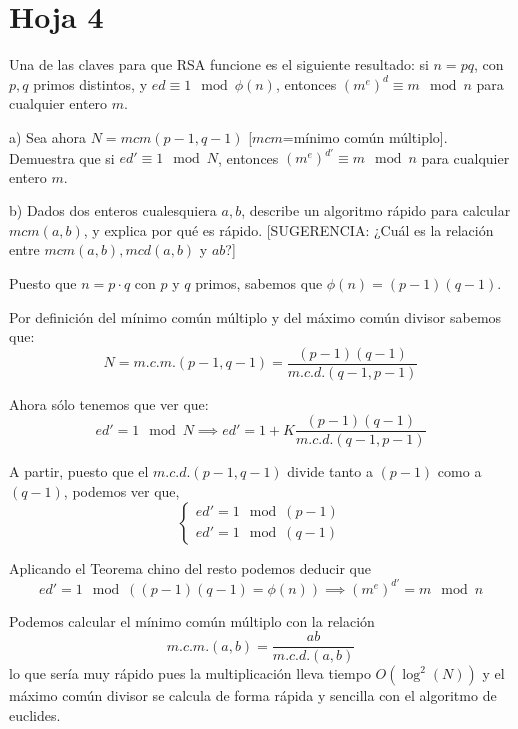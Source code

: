\section{Hoja 4}
\begin{problem}[1]
 Una de las claves para que RSA funcione es el siguiente resultado:
 si $n=pq$, con $p,q$ primos distintos, y  $ed\equiv 1 \mod \phi(n)$, entonces $(m^e)^d\equiv m \mod n$ para cualquier entero $m$.

a) Sea ahora $N=mcm(p-1,q-1)$ [$mcm$=mínimo común múltiplo].
Demuestra que si  $ed'\equiv 1 \mod N$, entonces $(m^e)^{d'}\equiv
m \mod n$ para cualquier entero $m$.

b) Dados dos enteros cualesquiera $a,b$, describe un algoritmo
rápido para calcular $mcm(a,b)$, y explica por qué es rápido.
[SUGERENCIA: ¿Cuál es la relación entre $mcm(a,b), mcd(a,b)$ y
$ab$?]
\solution


\spart
Puesto que $n=p\cdot q$ con $p$ y $q$ primos, sabemos que $\phi(n) = (p-1)(q-1)$.

Por definición del mínimo común múltiplo y del máximo común divisor sabemos que:
\[N=m.c.m.(p-1,q-1) = \frac{(p-1)(q-1)}{m.c.d.(q-1,p-1)}\]

Ahora sólo tenemos que ver que:
\[ed'=1\mod N \implies ed' = 1 + K\frac{(p-1)(q-1)}{m.c.d.(q-1,p-1)}\]

A partir, puesto que el $m.c.d.(p-1,q-1)$ divide tanto a $(p-1)$ como a $(q-1)$, podemos ver que,
\[\left\{ \begin{array}{l}
ed' = 1 \mod (p-1)\\
ed' = 1 \mod (q-1)
\end{array}\right.\]

Aplicando el Teorema chino del resto podemos deducir que
\[ed' = 1 \mod \left((p-1)(q-1)=\phi(n)\right) \implies (m^e)^{d'} = m \mod n\]

\spart

Podemos calcular el mínimo común múltiplo con la relación
\[m.c.m.(a,b) = \frac{ab}{m.c.d.(a,b)}\]
lo que sería muy rápido pues la multiplicación lleva tiempo $O(\log^2(N))$ y el máximo común divisor se calcula de forma rápida y sencilla con el algoritmo de euclides.

\end{problem}



